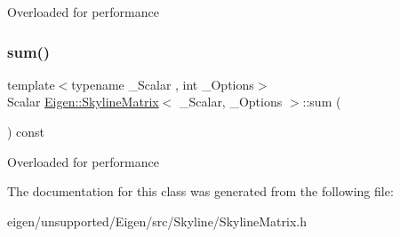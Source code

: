 Overloaded for performance \mbox{\label{class_eigen_1_1_skyline_matrix_a56c9841de52e52744a2d5e6593979154}} 
\subsubsection{\texorpdfstring{sum()}{sum()}\hspace{0.1cm}{\footnotesize\ttfamily [2/2]}}
{\footnotesize\ttfamily template$<$typename \+\_\+\+Scalar , int \+\_\+\+Options$>$ \\
Scalar \hyperlink{class_eigen_1_1_skyline_matrix}{Eigen\+::\+Skyline\+Matrix}$<$ \+\_\+\+Scalar, \+\_\+\+Options $>$\+::sum (\begin{DoxyParamCaption}{ }\end{DoxyParamCaption}) const}

Overloaded for performance 

The documentation for this class was generated from the following file\+:\begin{DoxyCompactItemize}
\item 
eigen/unsupported/\+Eigen/src/\+Skyline/\+Skyline\+Matrix.\+h\end{DoxyCompactItemize}
